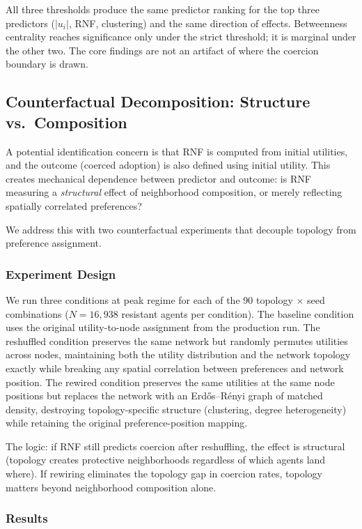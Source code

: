 \documentclass[11pt, a4paper]{article}
\begin{document}
All three thresholds produce the same predictor ranking for the top three predictors ($|u_i|$, RNF, clustering) and the same direction of effects. Betweenness centrality reaches significance only under the strict threshold; it is marginal under the other two. The core findings are not an artifact of where the coercion boundary is drawn.

\subsection{Counterfactual Decomposition: Structure vs.\ Composition}
\label{sec:counterfactual}

A potential identification concern is that RNF is computed from initial utilities, and the outcome (coerced adoption) is also defined using initial utility. This creates mechanical dependence between predictor and outcome: is RNF measuring a \textit{structural} effect of neighborhood composition, or merely reflecting spatially correlated preferences?

We address this with two counterfactual experiments that decouple topology from preference assignment.

\subsubsection{Experiment Design}

We run three conditions at peak regime for each of the 90 topology $\times$ seed combinations ($N = 16{,}938$ resistant agents per condition). The baseline condition uses the original utility-to-node assignment from the production run. The reshuffled condition preserves the same network but randomly permutes utilities across nodes, maintaining both the utility distribution and the network topology exactly while breaking any spatial correlation between preferences and network position. The rewired condition preserves the same utilities at the same node positions but replaces the network with an Erd\H{o}s--R\'{e}nyi graph of matched density, destroying topology-specific structure (clustering, degree heterogeneity) while retaining the original preference-position mapping.

The logic: if RNF still predicts coercion after reshuffling, the effect is structural (topology creates protective neighborhoods regardless of which agents land where). If rewiring eliminates the topology gap in coercion rates, topology matters beyond neighborhood composition alone.

\subsubsection{Results}
\end{document}
